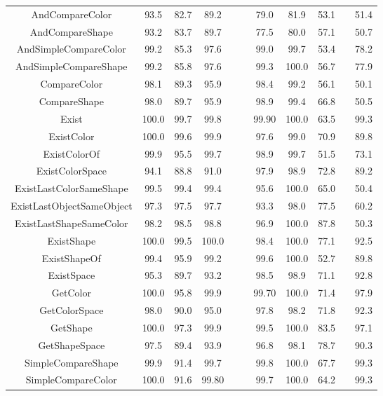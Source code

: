\begin{table}[t]
\begin{tabular}{ccccccccccc}
		
		AndCompareColor	&	93.5		&	82.7	&	89.2	&&	&	79.0	&81.9	&53.1&&	51.4
\\ 
		AndCompareShape	&	93.2 		&	83.7	&	89.7	&&	&	77.5&	80.0	&57.1	&&50.7\\ 
		AndSimpleCompareColor	&	99.2	&		85.3	&	97.6	&	&&	99.0	&99.7&	53.4&&	78.2\\ 
		AndSimpleCompareShape	&	99.2&			85.8	&	97.6	&&	&	99.3&	100.0	&56.7&&	77.9\\ 
		CompareColor	&	98.1		&	89.3	&	95.9	&&	&	98.4	&99.2&	56.1&&	50.1\\ 
		CompareShape	&	98.0	&		89.7	&	95.9	&&&	98.9	&99.4	&66.8	&&50.5
\\ 
		Exist	&	100.0	&		99.7	&	99.8		&&	&99.90&	100.0&	63.5&&	99.3\\ 
		ExistColor	&	100.0		&	99.6	&	99.9	&&	&	97.6&	99.0&	70.9&&	89.8\\ 
		ExistColorOf	&	99.9	&		95.5	&	99.7		& &&	98.9 &	99.7&	51.5&&	73.1\\ 
		ExistColorSpace	&94.1		&	88.8	&	91.0	&&	&	97.9&	98.9	&72.8	&&89.2\\ 
		ExistLastColorSameShape	&	99.5		&	99.4	&99.4	&&	&	95.6	&100.0	&65.0&&	50.4
\\ 
		ExistLastObjectSameObject	&	97.3	&		97.5	&	97.7	&&	&	93.3&	98.0&	77.5	&&60.2\\ 
		ExistLastShapeSameColor	&	98.2		&	98.5&	98.8	&&	&	96.9&	100.0&	87.8&&	50.3\\ 
		ExistShape	&	100.0	&	99.5	&	100.0	&&&	98.4&	100.0&	77.1	&&92.5\\ 
		ExistShapeOf	&	99.4		&	95.9	&	99.2	&&&		99.6	&100.0	&52.7&&89.8\\ 
		ExistSpace	&	95.3	&	89.7	&	93.2	&&		&98.5&	98.9	&71.1	&&92.8\\ 
		GetColor	&	100.0		&	95.8&	99.9	&&&	99.70&	100.0&	71.4&&	97.9\\ 
		GetColorSpace	&	98.0		&	90.0	&	95.0&	&&		97.8&	98.2	&71.8&&	92.3\\ 
		GetShape	&	100.0		&	97.3&	99.9&	&	&	99.5&	100.0  &83.5&&	97.1
\\ 
		GetShapeSpace	&	97.5	&	89.4	&	93.9	&&&	96.8&	98.1  &78.7	&&	90.3\\ 
		SimpleCompareShape	&	99.9		&	91.4	&	99.7	&	&&	99.8&	100.0 & 67.7&&	99.3\\ 
		SimpleCompareColor	&	100.0 		&	91.6  &	99.80&	&	&	99.7&	100.0&	64.2&&	99.3	  \\ 
		
		
		
		
		
		
		
		\bottomrule
	\end{tabular}
	\label{results}
\end{table}